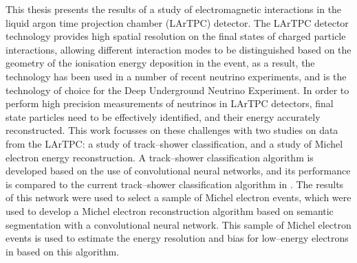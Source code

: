 This thesis presents the results of a study of electromagnetic interactions in 
the \protodune{} liquid argon time projection chamber (LArTPC) detector. The 
LArTPC detector technology provides high spatial resolution on the final states 
of charged particle interactions, allowing different interaction modes to be 
distinguished based on the geometry of the ionisation energy deposition in the 
event, as a result, the technology has been used in a number of recent neutrino
experiments, and is the technology of choice for the Deep Underground Neutrino 
Experiment. In order to perform high precision measurements of neutrinos in 
LArTPC detectors, final state particles need to be effectively identified, and 
their energy accurately reconstructed. This work focusses on these challenges 
with two studies on data from the \protodune{} LArTPC: a study of 
track--shower classification, and a study of Michel electron energy 
reconstruction. A track--shower classification algorithm is developed based on 
the use of convolutional neural networks, and its performance is compared to 
the current track--shower classification algorithm in \protodune{}. The results
of this network were used to select a sample of Michel electron events, which
were used to develop a Michel electron reconstruction algorithm based on 
semantic segmentation with a convolutional neural network. This sample of 
Michel electron events is used to estimate the energy resolution and bias for 
low--energy electrons in \protodune{} based on this algorithm.
